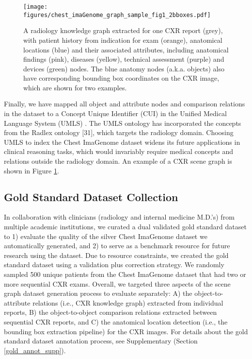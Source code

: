 \begin{figure}[tb!]
\centering
\texttt{[image: figures/chest\_imaGenome\_graph\_sample\_fig1\_2bboxes.pdf]}
\vspace{-0.4cm}
\caption{A radiology knowledge graph extracted for one CXR report (grey), with patient history from indication for exam (orange), anatomical locations (blue) and their associated attributes, including anatomical findings (pink), diseases (yellow), technical assessment (purple) and devices (green) nodes. The blue anatomy nodes (a.k.a. objects) also have corresponding bounding box coordinates on the CXR image, which are shown for two examples. }
\label{fig1.cxr_graph}
\vspace{-15pt}
\end{figure}


Finally, we have mapped all object and attribute nodes and comparison relations in the dataset to a Concept Unique Identifier (CUI) in the Unified Medical Language System (UMLS) \cite{bodenreider2004unified}. The UMLS ontology has incorporated the concepts from the Radlex ontology [31], which targets the radiology domain. Choosing UMLS to index the Chest ImaGenome dataset widens its future applications in clinical reasoning tasks, which would invariably require medical concepts and relations outside the radiology domain. An example of a CXR scene graph is shown in Figure \ref{fig1.cxr_graph}.

\vspace{-5pt}
\subsection*{Gold Standard Dataset Collection}
\vspace{-2pt}
In collaboration with clinicians (radiology and internal medicine M.D.'s) from multiple academic institutions, we curated a dual validated gold standard dataset to 1) evaluate the quality of the silver Chest ImaGenome dataset we automatically generated, and 2) to serve as a benchmark resource for future research using the dataset. Due to resource constraints, we created the gold standard dataset using a validation plus correction strategy. We randomly sampled 500 unique patients from the Chest ImaGenome dataset that had two or more sequential CXR exams. Overall, we targeted three aspects of the scene graph dataset generation process to evaluate separately: A) the object-to-attribute relations (i.e., CXR knowledge graph) extracted from individual reports, B) the object-to-object comparison relations extracted between sequential CXR reports, and C) the anatomical location detection (i.e., the bounding box extraction pipeline) for the CXR images. For details about the gold standard dataset annotation process, see Supplementary (Section \ref{gold_annot_supp}).

